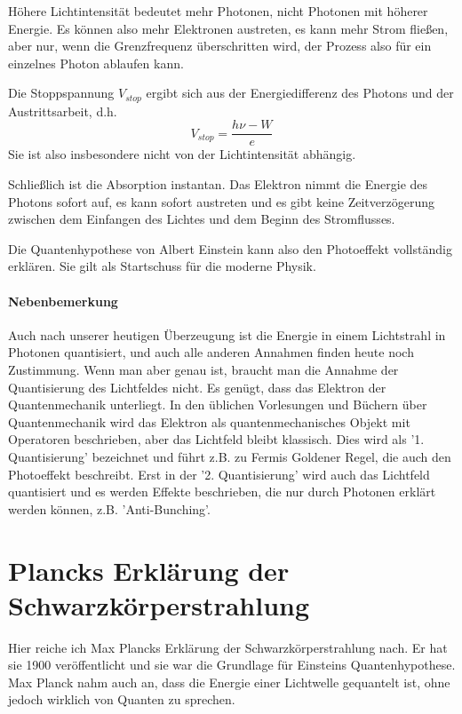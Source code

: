  Höhere Lichtintensität bedeutet mehr Photonen, nicht Photonen mit höherer Energie. Es können also mehr Elektronen austreten, es kann mehr Strom fließen, aber nur, wenn die Grenzfrequenz überschritten wird, der Prozess also für ein einzelnes Photon ablaufen kann.

 Die Stoppspannung $V_{stop}$ ergibt sich aus der Energiedifferenz des Photons und der Austrittsarbeit, d.h. 
 \begin{equation}
     V_{stop} = \frac{h \nu - W}{e}
 \end{equation}
 Sie ist also insbesondere nicht von der Lichtintensität abhängig.

 Schließlich ist die Absorption instantan. Das Elektron nimmt die Energie des Photons sofort auf, es kann sofort austreten und es gibt keine Zeitverzögerung zwischen dem Einfangen des Lichtes und dem Beginn des Stromflusses.

 Die Quantenhypothese von Albert Einstein kann also den Photoeffekt vollständig erklären. Sie gilt als Startschuss für die moderne Physik.

 \paragraph*{Nebenbemerkung} Auch nach unserer heutigen Überzeugung ist die Energie in einem Lichtstrahl in Photonen quantisiert, und auch alle anderen Annahmen finden heute noch Zustimmung. Wenn man aber genau ist, braucht man die Annahme der Quantisierung des Lichtfeldes nicht. Es genügt, dass das Elektron der Quantenmechanik unterliegt. In den üblichen Vorlesungen und Büchern über Quantenmechanik wird das Elektron als quantenmechanisches Objekt mit Operatoren beschrieben, aber das Lichtfeld bleibt klassisch. Dies wird als '1. Quantisierung' bezeichnet und führt z.B. zu Fermis Goldener Regel, die auch den Photoeffekt beschreibt.
 Erst in der '2. Quantisierung' wird auch das Lichtfeld quantisiert und es werden Effekte beschrieben, die nur durch Photonen erklärt werden können, z.B. 'Anti-Bunching'.


 \section{Plancks Erklärung der Schwarzkörperstrahlung}

Hier reiche ich Max Plancks Erklärung der Schwarzkörperstrahlung nach. Er hat sie 1900 veröffentlicht und sie war die Grundlage für Einsteins Quantenhypothese. Max Planck nahm auch an, dass die Energie einer Lichtwelle gequantelt ist, ohne jedoch wirklich von Quanten zu sprechen.

